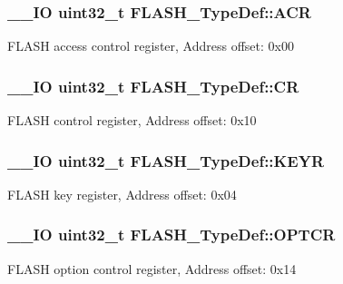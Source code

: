 \subsubsection[{A\+C\+R}]{\setlength{\rightskip}{0pt plus 5cm}\+\_\+\+\_\+\+I\+O uint32\+\_\+t F\+L\+A\+S\+H\+\_\+\+Type\+Def\+::\+A\+C\+R}\label{struct_f_l_a_s_h___type_def_aaf432a8a8948613f4f66fcace5d2e5fe}
F\+L\+A\+S\+H access control register, Address offset\+: 0x00 \hypertarget{struct_f_l_a_s_h___type_def_a7919306d0e032a855200420a57f884d7}{}
\subsubsection[{C\+R}]{\setlength{\rightskip}{0pt plus 5cm}\+\_\+\+\_\+\+I\+O uint32\+\_\+t F\+L\+A\+S\+H\+\_\+\+Type\+Def\+::\+C\+R}\label{struct_f_l_a_s_h___type_def_a7919306d0e032a855200420a57f884d7}
F\+L\+A\+S\+H control register, Address offset\+: 0x10 \hypertarget{struct_f_l_a_s_h___type_def_a802e9a26a89b44decd2d32d97f729dd3}{}
\subsubsection[{K\+E\+Y\+R}]{\setlength{\rightskip}{0pt plus 5cm}\+\_\+\+\_\+\+I\+O uint32\+\_\+t F\+L\+A\+S\+H\+\_\+\+Type\+Def\+::\+K\+E\+Y\+R}\label{struct_f_l_a_s_h___type_def_a802e9a26a89b44decd2d32d97f729dd3}
F\+L\+A\+S\+H key register, Address offset\+: 0x04 \hypertarget{struct_f_l_a_s_h___type_def_a54026c3b5bc2059f1b187acb6c4817ac}{}
\subsubsection[{O\+P\+T\+C\+R}]{\setlength{\rightskip}{0pt plus 5cm}\+\_\+\+\_\+\+I\+O uint32\+\_\+t F\+L\+A\+S\+H\+\_\+\+Type\+Def\+::\+O\+P\+T\+C\+R}\label{struct_f_l_a_s_h___type_def_a54026c3b5bc2059f1b187acb6c4817ac}
F\+L\+A\+S\+H option control register, Address offset\+: 0x14 \hypertarget{struct_f_l_a_s_h___type_def_a793cd13a4636c9785fdb99316f7fd7ab}{}
